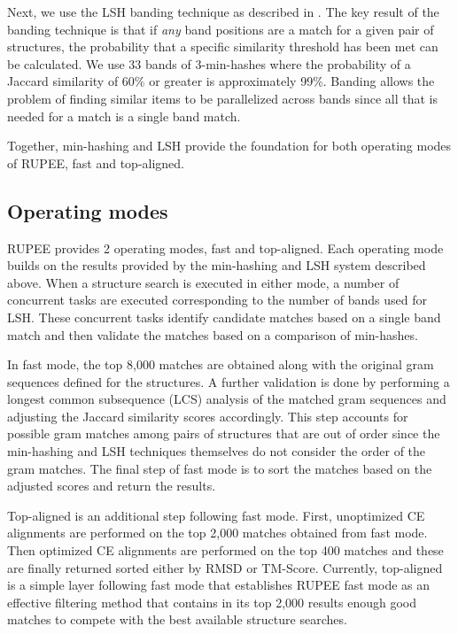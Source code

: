 \documentclass[a4,center,fleqn]{NAR}
\begin{document}
Next, we use the LSH banding technique as described in \cite{Rajaraman2012}.
The key result of the banding technique is that if \emph{any} band positions are a match for a given pair of structures, the probability that a specific similarity threshold has been met can be calculated. 
We use 33 bands of 3-min-hashes where the probability of a Jaccard similarity of 60\% or greater is approximately 99\%. 
Banding allows the problem of finding similar items to be parallelized across bands since all that is needed for a match is a single band match. 

Together, min-hashing and LSH provide the foundation for both operating modes of RUPEE, fast and top-aligned.

\subsection{Operating modes}

RUPEE provides 2 operating modes, fast and top-aligned. 
Each operating mode builds on the results provided by the min-hashing and LSH system described above. 
When a structure search is executed in either mode, a number of concurrent tasks are executed corresponding to the number of bands used for LSH. 
These concurrent tasks identify candidate matches based on a single band match and then validate the matches based on a comparison of min-hashes. 

In fast mode, the top 8,000 matches are obtained along with the original gram sequences defined for the structures.
A further validation is done by performing a longest common subsequence (LCS) analysis of the matched gram sequences and adjusting the Jaccard similarity scores accordingly.
This step accounts for possible gram matches among pairs of structures that are out of order since the min-hashing and LSH techniques themselves do not consider the order of the gram matches.
The final step of fast mode is to sort the matches based on the adjusted scores and return the results. 

Top-aligned is an additional step following fast mode. 
First, unoptimized CE alignments are performed on the top 2,000 matches obtained from fast mode. 
Then optimized CE alignments are performed on the top 400 matches and these are finally returned sorted either by RMSD or TM-Score. 
Currently, top-aligned is a simple layer following fast mode that establishes RUPEE fast mode as an effective filtering method that contains in its top 2,000 results enough good matches to compete with the best available structure searches. 
\end{document}
